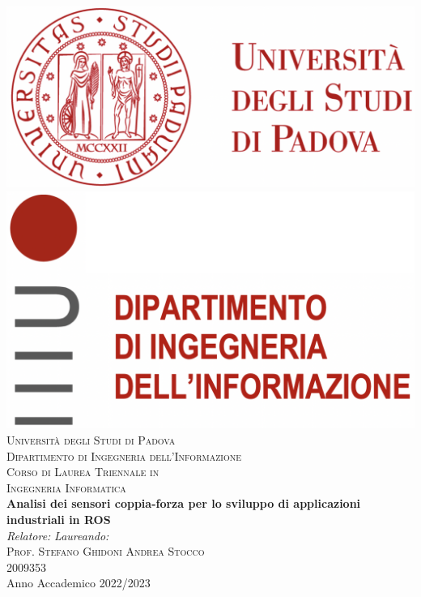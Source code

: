 


\begin{titlepage}
\begin{center}

\includegraphics[scale=0.2]{images/logo_unipd.png} \hfill \includegraphics[scale=0.2]{images/logo_dei.png}\\
\vspace{0.8cm}
\textsc{\LARGE Universit\`{a} degli Studi di Padova}\\
\vspace{0.45cm}
\textsc{\large Dipartimento di Ingegneria dell'Informazione}\\
\vspace{0.4cm}
\textsc{\large Corso di Laurea Triennale in}\\
\textsc{\large Ingegneria Informatica}\\
\vfill
{ \LARGE \bfseries Analisi dei sensori coppia-forza per lo sviluppo di applicazioni industriali in ROS
}\\
\vfill
\textit{\large Relatore:} \hfill \textit{\large Laureando:}\\
\textsc{\large Prof. Stefano Ghidoni} \hfill \textsc{Andrea Stocco}\\
\hfill \textsc{2009353}\\

\vfill
{\large Anno Accademico 2022/2023}
\end{center}
\end{titlepage}

